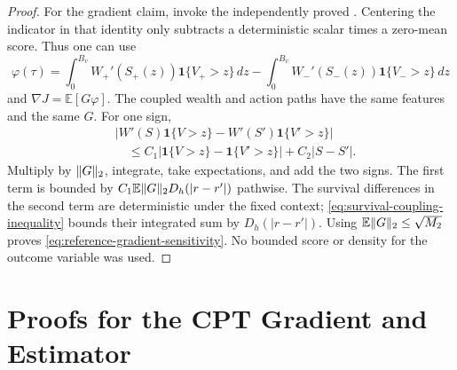 \documentclass[11pt]{article}
\newcommand{\E}{\mathbb E}
\newcommand{\1}{\mathbf 1}
\DeclarePairedDelimiter{\norm}{\lVert}{\rVert}
\theoremstyle{definition}
\begin{document}
\begin{proof}
For the gradient claim, invoke the independently proved . Centering the indicator in that identity only subtracts a deterministic scalar times a zero-mean score. Thus one can use
\[
 \varphi(\tau)=\int_0^{B_v}W_+'(S_+(z))\1\{V_+>z\}\,dz
 -\int_0^{B_v}W_-'(S_-(z))\1\{V_->z\}\,dz
\]
and $\nabla J=\E[G\varphi]$. The coupled wealth and action paths have the same features and the same $G$. For one sign,
\begin{align*}
 &|W'(S)\1\{V>z\}-W'(S')\1\{V'>z\}|\\
 &\hspace{1em}\le C_1|\1\{V>z\}-\1\{V'>z\}|+C_2|S-S'|.
\end{align*}
Multiply by $\norm{G}_2$, integrate, take expectations, and add the two signs. The first term is bounded by $C_1\E\norm{G}_2 D_h(|r-r'|)$ pathwise. The survival differences in the second term are deterministic under the fixed context; \eqref{eq:survival-coupling-inequality} bounds their integrated sum by $D_h(|r-r'|)$. Using $\E\norm{G}_2\le\sqrt{M_2}$ proves \eqref{eq:reference-gradient-sensitivity}. No bounded score or density for the outcome variable was used.
\end{proof}

\section{Proofs for the CPT Gradient and Estimator}\label{app:estimator-proofs}
\end{document}
